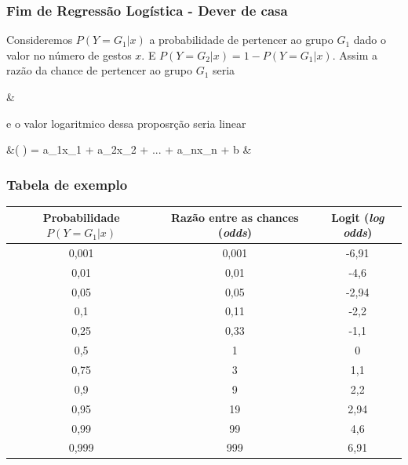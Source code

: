 \documentclass[graphics,14pt]{beamer}
\begin{document}
\begin{frame}[t,fragile=singleslide]
	\frametitle{Fim de Regressão Logística - Dever de casa}
	
	Consideremos $P(Y=G_1 |x)$ a probabilidade de pertencer ao grupo $G_1$ dado o valor no número de gestos $x$. 
	E $P(Y=G_2 |x) = 1 - P(Y=G_1 |x)$.
	\vspace{1.5cm}
	Assim a razão da chance de pertencer ao grupo $G_1$ seria 
	\begin{flalign*}
	&
	\end{flalign*}
	\vspace{1.5cm}
	e o valor logaritmico dessa proposrção seria linear
	\begin{flalign*}
	&\log \left(   \right) = a_{1}x_{1} + a_{2}x_{2} + ... + a_{n}x_{n} + b & \\
	\end{flalign*}
	
\end{frame}
\begin{frame}[t,fragile=singleslide]
	\frametitle{Tabela de exemplo}
	\begin{table}[]
		\begin{tabular}{|c|c|c|}
			\hline
			\rowcolor[HTML]{9B9B9B} 
			Probabilidade $P(Y=G_1 |x)$ & Razão entre as chances (\textit{odds}) & Logit (\textit{log odds}) \\ \hline
			0,001                       & 0,001                         & -6,91 \\ \hline
			0,01                        & 0,01                          & -4,6  \\ \hline
			0,05                        & 0,05                          & -2,94 \\ \hline
			0,1                         & 0,11                          & -2,2  \\ \hline
			0,25                        & 0,33                          & -1,1  \\ \hline
			\rowcolor[HTML]{EFEFEF} 
			0,5                         & 1                             & 0     \\ \hline
			0,75                        & 3                             & 1,1   \\ \hline
			0,9                         & 9                             & 2,2   \\ \hline
			0,95                        & 19                            & 2,94  \\ \hline
			0,99                        & 99                            & 4,6   \\ \hline
			0,999                       & 999                           & 6,91  \\ \hline
		\end{tabular}
	\end{table}

\end{frame}
\end{document}
